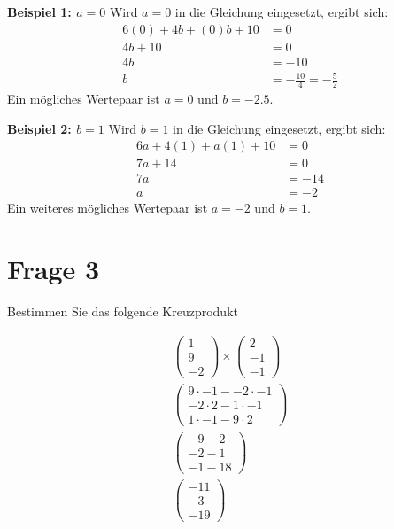 \textbf{Beispiel 1: $a=0$}
Wird $a=0$ in die Gleichung eingesetzt, ergibt sich:
\begin{align*}
    6(0) + 4b + (0)b + 10 & = 0                            \\
    4b + 10               & = 0                            \\
    4b                    & = -10                          \\
    b                     & = -\frac{10}{4} = -\frac{5}{2}
\end{align*}
Ein mögliches Wertepaar ist $a=0$ und $b = -2.5$.

\textbf{Beispiel 2: $b=1$}
Wird $b=1$ in die Gleichung eingesetzt, ergibt sich:
\begin{align*}
    6a + 4(1) + a(1) + 10 & = 0   \\
    7a + 14               & = 0   \\
    7a                    & = -14 \\
    a                     & = -2
\end{align*}
Ein weiteres mögliches Wertepaar ist $a=-2$ und $b=1$.

\section{Frage 3}

Bestimmen Sie das folgende Kreuzprodukt

\begin{align*}
    \begin{pmatrix}
        1 \\ 9 \\ -2
    \end{pmatrix} \times \begin{pmatrix}
                             2 \\ -1 \\ -1
                         \end{pmatrix} \\
    \begin{pmatrix}
        9 \cdot -1 - -2 \cdot -1 \\
        -2 \cdot 2 - 1 \cdot -1  \\
        1 \cdot -1 - 9 \cdot 2
    \end{pmatrix}            \\
    \begin{pmatrix}
        -9 - 2 \\
        -2 - 1 \\
        -1 - 18
    \end{pmatrix}                      \\
    \begin{pmatrix}
        -11 \\ -3 \\ -19
    \end{pmatrix}
\end{align*}


